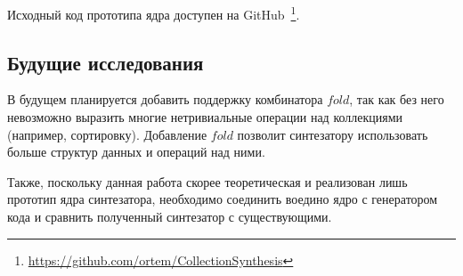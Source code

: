\documentclass[14pt]{matmex-diploma-custom}
\begin{document}
Исходный код прототипа ядра доступен на GitHub~\footnote{\url{https://github.com/ortem/CollectionSynthesis}}.

\subsection*{Будущие исследования}
В будущем планируется добавить поддержку комбинатора $fold$, так как без него невозможно выразить многие нетривиальные операции над коллекциями (например, сортировку).
Добавление $fold$ позволит синтезатору использовать больше структур данных и операций над ними.

Также, поскольку данная работа скорее теоретическая и реализован лишь прототип ядра синтезатора, необходимо соединить воедино ядро с генератором кода и сравнить полученный синтезатор с существующими.


\setmonofont[Mapping=tex-text]{CMU Typewriter Text}


\end{document}
